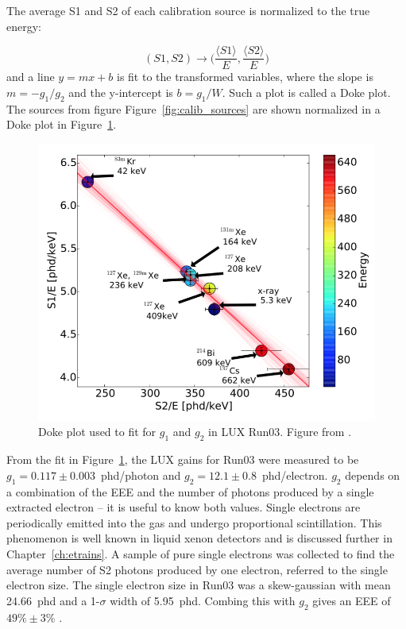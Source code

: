 The average S1 and S2 of each calibration source is normalized to the true energy:

\begin{equation}
(S1, S2) \longrightarrow \Big(\frac{\langle S1 \rangle}{E}, \frac{\langle S2 \rangle}{E}\Big)
\end{equation}
and a line $y = mx + b$ is fit to the transformed variables, where the slope is $m = -g_{1} / g_{2}$ and the y-intercept is $b = g_{1} / W$. Such a plot is called a Doke plot. The sources from figure Figure~\ref{fig:calib_sources} are shown normalized in a Doke plot in Figure~\ref{fig:doke}.

\begin{figure}[htbp]
\begin{center}
\includegraphics[width=\textwidth]{figures/lux/doke.png}
\caption{ Doke plot used to fit for $g_{1}$ and $g_{2}$ in \acs{LUX} Run03. Figure from \cite{LUX:Run03Comprehensive}.}
\label{fig:doke}
\end{center}
\end{figure}

From the fit in Figure~\ref{fig:doke}, the \ac{LUX} gains for Run03 were measured to be $g_{1} = 0.117 \pm 0.003$~phd/photon and $g_{2} = 12.1 \pm 0.8$~phd/electron. $g_{2}$ depends on a combination of the \ac{EEE} and the number of photons produced by a single extracted electron -- it is useful to know both values. Single electrons are periodically emitted into the gas and undergo proportional scintillation. This phenomenon is well known in liquid xenon detectors and is discussed further in Chapter~\ref{ch:etrains}. A sample of pure single electrons was collected to find the average number of S2 photons produced by one electron, referred to the single electron size. The single electron size in Run03 was a skew-gaussian with mean 24.66~phd and a 1-$\sigma$ width of 5.95~phd. Combing this with $g_{2}$ gives an \ac{EEE} of $49\% \pm 3\%$ \cite{LUX:Run03Comprehensive}.

